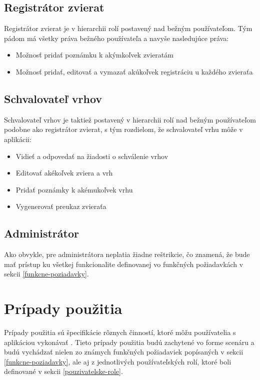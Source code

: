 \subsection{Registrátor zvierat}\label{registrator-zvierat}
Registrátor zvierat je v hierarchii rolí postavený nad bežným používateľom. Tým pádom má všetky práva bežného používateľa a navyše nasledujúce práva:

\begin{itemize}
	\item Možnosť pridať poznámku k akýmkoľvek zvieratám
	\item Možnosť pridať, editovať a vymazať akúkoľvek registráciu u každého zvieraťa
\end{itemize} 

\subsection{Schvalovateľ vrhov}\label{schvalovatel-vrhov}
Schvalovateľ vrhov je taktiež postavený v hierarchii rolí nad bežným používateľom podobne ako registrátor zvierat, s tým rozdielom, že schvalovateľ vrhu môže v aplikácii:

\begin{itemize}
	\item Vidieť a odpovedať na žiadosti o schválenie vrhov
	\item Editovať akékoľvek zviera a vrh
	\item Pridať poznámky k akémukoľvek vrhu
	\item Vygenerovať preukaz zvieraťa
\end{itemize}

\subsection{Administrátor}\label{administrator}
Ako obvykle, pre administrátora neplatia žiadne reštrikcie, čo znamená, že bude mať prístup ku všetkej funkcionalite definovanej vo funkčných požiadavkách v sekcii \ref{funkcne-poziadavky}.

\section{Prípady použitia}\label{pripady-pouzitia}
Prípady použitia sú špecifikácie rôznych činností, ktoré môžu používatelia s aplikáciou vykonávať \cite{co-su-pripady-pouzitia}. Tieto prípady použitia budú zachytené vo forme scenáru a budú vychádzať nielen zo známych funkčných požiadaviek popísaných v sekcii \ref{funkcne-poziadavky}, ale aj z jednotlivých používateľských rolí, ktoré boli definované v sekcii \ref{pouzivatelske-role}.

